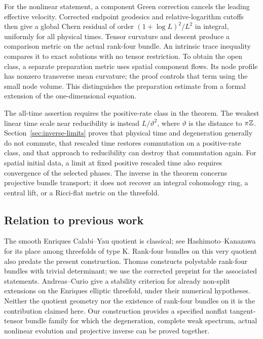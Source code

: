 For the nonlinear statement, a component Green correction cancels
the leading effective velocity. Corrected endpoint geodesics and
relative-logarithm cutoffs then give a global Chern residual of
order $(1+\log L)^2/L^2$ in integral, uniformly for all physical
times. Tensor curvature and descent produce a comparison metric on
the actual rank-four bundle. An intrinsic trace inequality compares
it to exact solutions with no tensor restriction. To obtain the
open class, a separate preparation metric uses spatial component
flows. Its node profile has nonzero transverse mean curvature;
the proof controls that term using the small node volume. This
distinguishes the preparation estimate from a formal extension of
the one-dimensional equation.

The all-time assertion requires the positive-rate class in the
theorem. The weakest linear time scale near reducibility is instead
$L/\vartheta^2$, where $\vartheta$ is the distance to $\pi\mathbb Z$.
Section~\ref{sec:inverse-limits} proves that physical time and
degeneration generally do not commute, that rescaled time restores
commutation on a positive-rate class, and that approach to reducibility
can destroy that commutation again. For spatial initial data, a
limit at fixed positive rescaled time also requires convergence of
the selected phases. The inverse in the theorem concerns projective
bundle transport; it does not recover an integral cohomology ring,
a central lift, or a Ricci-flat metric on the threefold.

\subsection{Relation to previous work}
The smooth Enriques Calabi--Yau quotient is classical; see
Hashimoto--Kanazawa \cite{hashimoto-kanazawa} for its place among
threefolds of type K. Rank-four bundles on this very quotient
also predate the present construction. Thomas \cite[Section 2,
Theorem 2.4]{thomas} constructs polystable rank-four bundles with
trivial determinant; we use the corrected preprint for the associated
statements. Andreas--Curio \cite[Section 4, Proposition 4.2]{andreas-curio}
give a stability criterion for already non-split extensions on the
Enriques elliptic threefold, under their numerical hypotheses.
Neither the quotient geometry nor the existence of rank-four bundles
on it is the contribution claimed here. Our construction provides
a specified nonflat tangent-tensor bundle family for which the
degeneration, complete weak spectrum, actual nonlinear evolution
and projective inverse can be proved together.

